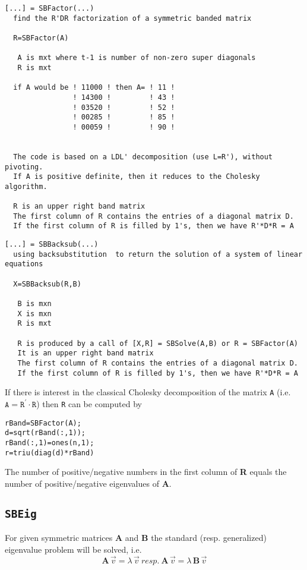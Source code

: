 \documentclass[11pt]{article}
\newcommand{\text}[1]{\ #1 \ }
\newcommand{\ID}[1]{\index{#1}}
\begin{document}
\begin{verbatim}
[...] = SBFactor(...)
  find the R'DR factorization of a symmetric banded matrix

  R=SBFactor(A)

   A is mxt where t-1 is number of non-zero super diagonals
   R is mxt

  if A would be ! 11000 ! then A= ! 11 !
                ! 14300 !         ! 43 !
                ! 03520 !         ! 52 !
                ! 00285 !         ! 85 !
                ! 00059 !         ! 90 !


  The code is based on a LDL' decomposition (use L=R'), without pivoting.
  If A is positive definite, then it reduces to the Cholesky algorithm.

  R is an upper right band matrix
  The first column of R contains the entries of a diagonal matrix D.
  If the first column of R is filled by 1's, then we have R'*D*R = A
\end{verbatim}

\begin{verbatim}
[...] = SBBacksub(...)
  using backsubstitution  to return the solution of a system of linear equations

  X=SBBacksub(R,B)

   B is mxn
   X is mxn
   R is mxt

   R is produced by a call of [X,R] = SBSolve(A,B) or R = SBFactor(A)
   It is an upper right band matrix
   The first column of R contains the entries of a diagonal matrix D.
   If the first column of R is filled by 1's, then we have R'*D*R = A
\end{verbatim}


If there is interest in the classical Cholesky decomposition
\ID{Cholesky decomposition}  of the matrix \texttt{A} 
(i.e. $\mathtt{A}=\mathtt{R}^\prime\cdot \mathtt{R}$) then \texttt{R} can be
computed by
\begin{verbatim}
rBand=SBFactor(A);
d=sqrt(rBand(:,1));
rBand(:,1)=ones(n,1);
r=triu(diag(d)*rBand)
\end{verbatim}

The number of positive/negative numbers in the first column of \textbf{R}
equals the number of positive/negative eigenvalues of \textbf{A}.


\subsection{\texttt{SBEig}}\ID{SBEig}
For given symmetric matrices \textbf{A} and \textbf{B} the standard
(resp. generalized) eigenvalue problem will be solved, i.e.
\[ \mathbf{A}\,\vec v=\lambda\,\vec v \text{resp.}
   \mathbf{A}\,\vec v=\lambda\,\mathbf{B}\,\vec v  \]
\end{document}
